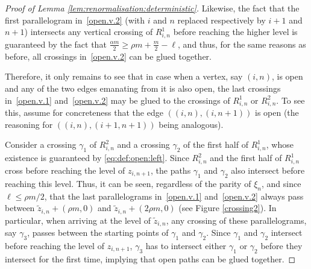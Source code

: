 \documentclass[pdflatex,sn-mathphys-num]{sn-jnl}%
\newcommand{\1}{{\ensuremath{\mathbf{1}}} }
\theoremstyle{thmstyleone}%
\theoremstyle{thmstyletwo}%
\theoremstyle{thmstylethree}%
\begin{document}
\begin{proof}[Proof of Lemma \ref{lem:renormalisation:deterministic}]
Likewise, the fact that the first parallelogram in~\eqref{open.v.2} (with $i$ and $n$ replaced respectively by $i+1$ and $n+1$) intersects any vertical crossing of $R_{i,n}^1$ before reaching the higher level is guaranteed by the fact that $\frac{\alpha m}{2}\ge \rho m +\frac m 2 - \ell$, and thus, for the same reasons as before, 
all crossings in~\eqref{open.v.2} can be glued together.  

Therefore, 
it only remains to see that in case when a vertex, say $(i,n)$, is open and any of the two edges emanating from it is also open, the last crossings in~\eqref{open.v.1} and~\eqref{open.v.2} may be glued to the crossings of  $R_{i,n}^1$ or $R_{i,n}^2$. To see this, assume for concreteness that the edge $((i,n),(i,n+1))$ is open (the reasoning for $((i,n),(i+1,n+1))$ being analogous). 

Consider a crossing $\gamma_1$ of $R_{i,n}^2$ and a crossing $\gamma_2$ of the first half of $R_{i,n}^1$, whose existence is guaranteed by \eqref{eq:def:open:left}. 
Since $R_{i,n}^2$ and the first half of $R_{i,n}^1$ cross before reaching the level of $z_{i,n+1}$, the  
paths $\gamma_1$ and $\gamma_2$ also  
intersect before reaching this level. 
Thus, it can be seen, regardless of the parity of $\xi_n$, and since $\ell \le \rho m /2$, 
that the last parallelograms in~\eqref{open.v.1} and~\eqref{open.v.2} always pass between $\widetilde z_{i,n} + (\rho m,0)$ and 
$\widetilde z_{i,n} + (2\rho m,0)$ (see Figure \ref{crossing2}). In particular, when arriving at the level of $\widetilde z_{i,n}$, any crossing of these parallelograms, say $\gamma_3$, passes between the starting points of $\gamma_1$ and $\gamma_2$. Since $\gamma_1$ and $\gamma_2$ intersect before reaching the level of $z_{i,n+1}$, $\gamma_3$ has to intersect either $\gamma_1$ or $\gamma_2$ before they intersect for the first time, implying that open paths can be glued together.
\qedhere
\end{proof}


\appendix





\end{document}
